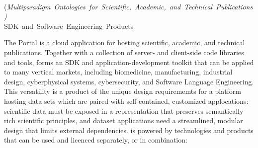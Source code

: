 \documentclass[11pt,letterpaper]{article}
\begin{document}
\vspace*{-6em}

\begin{center}
{}\\
\vspace{8pt}
\mbox{(\textit{Multiparadigm Ontologies for 
Scientific, Academic, and Technical Publications)}}\\\vspace{2pt}
\mbox{{\Large SDK and Software Engineering Products}}\\\vspace{8pt}
\end{center}

\vspace*{-.2em}

The {\MOSAIC} Portal is a cloud application for hosting 
scientific, academic, and 
technical publications.  Together with a collection 
of server- and client-side code libraries and tools, 
{\MOSAIC} forms an SDK and application-development 
toolkit that can be applied to many vertical markets, 
including biomedicine, manufacturing, industrial design, 
cyberphysical systems, cybersecurity, and Software 
Language Engineering.  This versatility is a product 
of the unique design requirememts for a platform 
hosting data sets which are paired with 
self-contained, customized applocations: scientific 
data must be exposed in a representation that preserves 
semantically rich scientific principles, and 
dataset applications need a streamlined, modular 
design that limits external dependencies.
\EnglischeLinie
{\lfMOSAIC} is powered by technologies and products that can 
be used and licenced separately, or in combination: 
\end{document}
